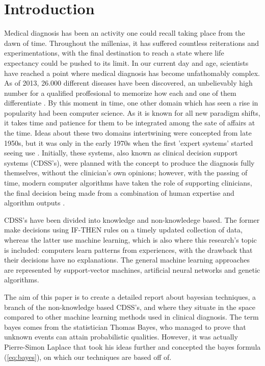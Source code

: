 \documentclass[3p,times,procedia]{elsarticle}
\begin{document}



\section{Introduction}\label{introduction}
Medical diagnosis has been an activity one could recall taking place
from the dawn of time. Throughout the millenias, it has suffered countless
reiterations and experimentations, with the final destination to reach
a state where life expectancy could be pushed to its limit. 
In our current day and age, scientists have reached a point where medical
diagnosis has become unfathomably complex. As of 2013, 26.000 different
diseases have been discovered, an unbelievably high number for a qualified
proffesional to memorize how each and one of them differentiate \cite{Espe2018Malacards}.
By this moment in time, one other domain which has seen a rise in popularity had been
computer science. As it is known for all new paradigm shifts, it takes time and
patience for them to be integrated among the sate of affairs at the time. 
Ideas about these two domains intertwining were concepted from late 1950s, but
it was only in the early 1970s when the first 'expert systems' started seeing use
\cite{WikipediaCAD2024}. Initially, these systems, also  known as clinical
decision support systems (CDSS's), were planned with the concept to produce the diagnosis
fully themselves, without the clinician's own opinions; however, with the passing
of time, modern computer algorithms have taken the role of supporting clinicians,
the final decision being made from a combination of human expertise and algorithm
outputs \cite{WikipediaCDSS2024}.

CDSS's have been divided into knowledge and non-knowledege based.
The former make decisions using IF-THEN rules on a timely
updated collection of data, whereas the latter use machine
learning, which is also where this research's topic is included:
computers learn patterns from experiences, with the
drawback that their decisions have no explanations. The general
machine learning approaches are represented by support-vector
machines, artificial neural networks and genetic algorithms.

The aim of this paper is to create a detailed report about
bayesian techniques, a branch of the non-knowledge based CDSS's,
and where they situate in the space compared to other machine learning
methods used in clinical diagnosis.
The term bayes comes from the statistician Thomas Bayes, who
managed to prove that unknown events can attain probabilistic
qualities. However, it was actually Pierre-Simon Laplace that 
took his ideas further and concepted the bayes formula (\ref{eq:bayes}),
on which our techniques are based off of.
\end{document}
